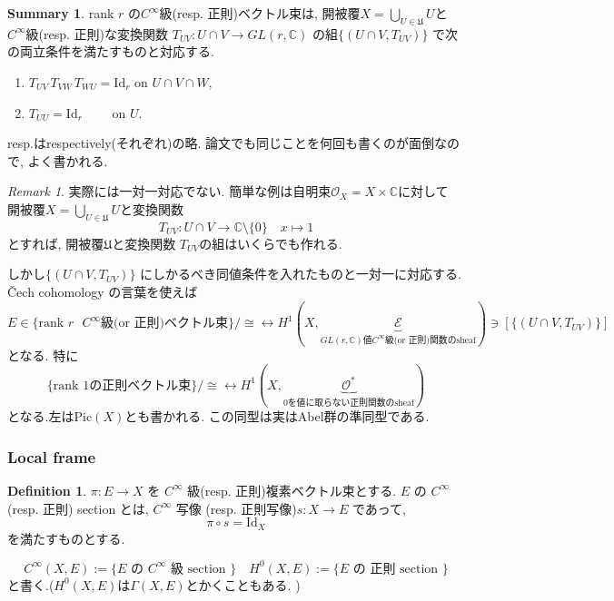\documentclass[dvipdfmx,a4paper,11pt]{article} %
\theoremstyle{definition}
\newtheorem{defn}[thm]{Definition}
\newtheorem{suma}[thm]{Summary}
\theoremstyle{remark}
\newtheorem{rem}[thm]{Remark}
\numberwithin{equation}{section}
\newcommand{\C}{\mathbb{C}}
\newcommand{\xr}[1]{\textcolor{red}{#1}}
\begin{document}
\begin{tcolorbox}[mybox]
\begin{suma}
 rank \(r\) の$C^\infty$級(resp. 正則)ベクトル束は, 開被覆$X=\bigcup_{U\in\mathfrak{U}}U$と$C^\infty$級(resp. 正則)な変換関数 \(T_{UV} : U \cap V \to GL(r,\mathbb{C})\) の組\(\{ (U \cap V , T_{UV})\}\) で次の両立条件を満たすものと対応する.
\begin{enumerate}
\item[(G-1)] $T_{UV}\,T_{VW}\,T_{WU}=\mathrm{Id}_r
\text{ on } U\cap V\cap W,$
\item[(G-2)] $T_{UU}=\mathrm{Id}_r
\qquad
\text{ on } U.$
\end{enumerate}
\end{suma}
\end{tcolorbox}
resp.はrespectively(それぞれ)の略. 論文でも同じことを何回も書くのが面倒なので, よく書かれる.
\begin{rem}
実際には一対一対応でない. 簡単な例は自明束$\mathcal{O}_X=X \times \C$に対して
開被覆$X=\bigcup_{U\in\mathfrak{U}}U$と変換関数
$$
T_{UV} : U \cap V \to \C \setminus \{0\}
\quad x \mapsto 1
$$
とすれば,  開被覆$\mathfrak{U}$と変換関数 $T_{UV}$の組はいくらでも作れる. 


しかし\(\{ (U \cap V , T_{UV})\}\) にしかるべき同値条件を入れたものと一対一に対応する. \v{C}ech cohomology の言葉を使えば
$$
E \in \{\text{rank $r$ $C^{\infty}$級(or 正則)ベクトル束}\}/\cong
\leftrightarrow 
H^1(X, \underbrace{\mathcal{E}}_{\text{$GL(r,\mathbb{C})$値$C^{\infty}$級(or 正則)関数のsheaf}}) \ni [\{ (U \cap V , T_{UV})\}]
$$
となる.
特に
$$
\{\text{rank  $1$の正則ベクトル束}\}/\cong
\leftrightarrow 
H^1(X, \underbrace{\mathcal{O}^{*}}_{\text{0を値に取らない正則関数のsheaf}})
$$
となる.左は$\mathrm{Pic}(X)$とも書かれる. この同型は実はAbel群の準同型である. 
\end{rem}

\subsubsection{Local frame}
\begin{defn}
\(\pi\colon E\to X\) を \(C^{\infty}\) 級(resp. 正則)複素ベクトル束とする. \(E\) の  \(C^{\infty}\) (resp. 正則) section とは,  \(C^{\infty}\) 写像 (resp. 正則写像)\(s\colon X\longrightarrow E\) であって,
\[
\pi\circ s=\mathrm{Id}_X
\]
を満たすものとする.

\[
C^\infty(X,E):=\{\text{\(E\) の \(C^\infty\) 級 section }\}
\quad 
H^0(X,E) :=\{\text{\(E\) の 正則 section }\}
\]
と書く.($H^0(X,E)$は$\Gamma(X,E)$とかくこともある. )
\end{defn}
\end{document}
